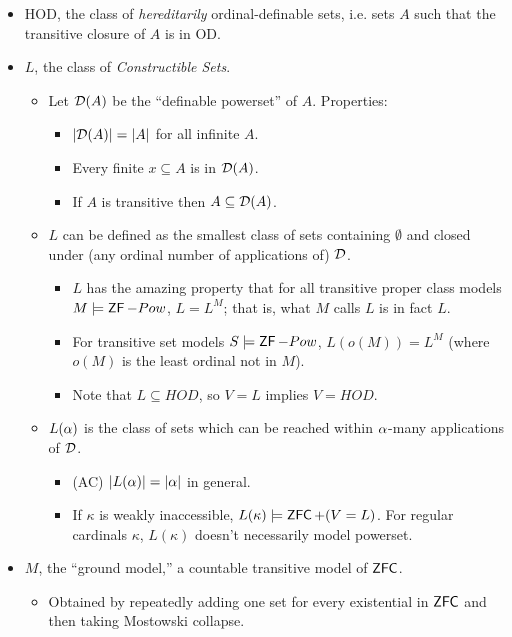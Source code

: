 \documentclass{amsart}
\DeclareMathOperator{\ZFC}{\sf{ZFC}}
\DeclareMathOperator{\ZF}{\sf{ZF}}
\begin{document}
\begin{itemize}
\begin{itemize}
		\item Also $V=OD$ is consistent, though $OD$ is not transitive.
	\end{itemize}
	\item HOD, the class of \textit{hereditarily} ordinal-definable sets, i.e. sets $A$ such that the transitive closure of $A$ is in OD.
	\item $L$, the class of \textit{Constructible Sets}.
	\begin{itemize}
		\item Let $\mathcal{D}(A)$ be the ``definable powerset'' of $A$. Properties:
		\begin{itemize}
			\item $|\mathcal{D}(A)|=|A|$ for all infinite $A$.
			\item Every finite $x\subseteq A$ is in $\mathcal{D}(A)$.
			\item If $A$ is transitive then $A\subseteq \mathcal{D}(A)$.
		\end{itemize}
		\item $L$ can be defined as the smallest class of sets containing $\emptyset$ and closed under (any ordinal number of applications of) $\mathcal{D}$.
		\begin{itemize}
			\item $L$ has the amazing property that for all transitive proper class models $M\models \ZF - Pow$, $L = L^M$; that is, what $M$ calls $L$ is in fact $L$.
			\item For transitive set models $S\models \ZF- Pow$, $L(o(M))=L^M$ (where $o(M)$ is the least ordinal not in $M$).
			\item Note that $L\subseteq HOD$, so $V=L$ implies $V=HOD$.
		\end{itemize}
		\item $L(\alpha)$ is the class of sets which can be reached within $\alpha$-many applications of $\mathcal{D}$.
		\begin{itemize}
			\item (AC) $|L(\alpha)|=|\alpha|$ in general.
			\item If $\kappa$ is weakly inaccessible, $L(\kappa)\models \ZFC+ (V=L)$. For regular cardinals $\kappa$, $L(\kappa)$ doesn't necessarily model powerset.
		\end{itemize}
	\end{itemize}
	\item $M$, the ``ground model,'' a countable transitive model of $\ZFC$.
	\begin{itemize}
		\item Obtained by repeatedly adding one set for every existential in $\ZFC$ and then taking Mostowski collapse.
	\end{itemize} 
	\end{itemize}
	
\end{document}
